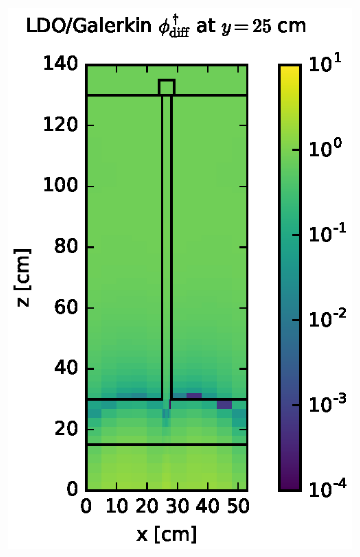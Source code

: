 \begin{figure}[!htb]
\begin{subfigure}{0.4\textwidth}
\includegraphics[max height=0.445\textheight]
{img/steel-plots/fwc-adj/flux-diff-rel-gkn04.eps}
\end{subfigure}
\\
\begin{subfigure}{0.4\textwidth}

\end{subfigure}
\end{figure}
